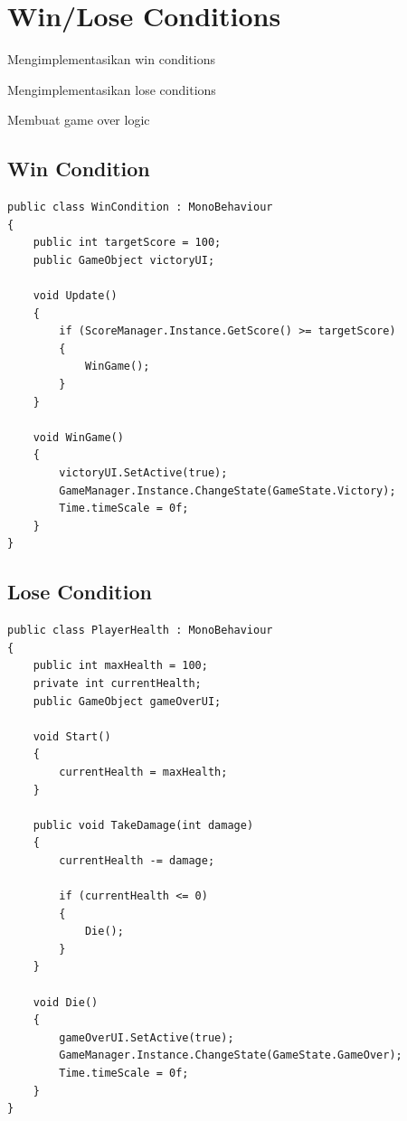 
\section{Win/Lose Conditions}

\begin{learningoutcomes}
\item Mengimplementasikan win conditions
\item Mengimplementasikan lose conditions
\item Membuat game over logic
\end{learningoutcomes}

\subsection{Win Condition}

\begin{lstlisting}[language={[Sharp]C}]
public class WinCondition : MonoBehaviour
{
    public int targetScore = 100;
    public GameObject victoryUI;
    
    void Update()
    {
        if (ScoreManager.Instance.GetScore() >= targetScore)
        {
            WinGame();
        }
    }
    
    void WinGame()
    {
        victoryUI.SetActive(true);
        GameManager.Instance.ChangeState(GameState.Victory);
        Time.timeScale = 0f;
    }
}
\end{lstlisting}

\subsection{Lose Condition}

\begin{lstlisting}[language={[Sharp]C}]
public class PlayerHealth : MonoBehaviour
{
    public int maxHealth = 100;
    private int currentHealth;
    public GameObject gameOverUI;
    
    void Start()
    {
        currentHealth = maxHealth;
    }
    
    public void TakeDamage(int damage)
    {
        currentHealth -= damage;
        
        if (currentHealth <= 0)
        {
            Die();
        }
    }
    
    void Die()
    {
        gameOverUI.SetActive(true);
        GameManager.Instance.ChangeState(GameState.GameOver);
        Time.timeScale = 0f;
    }
}
\end{lstlisting}

